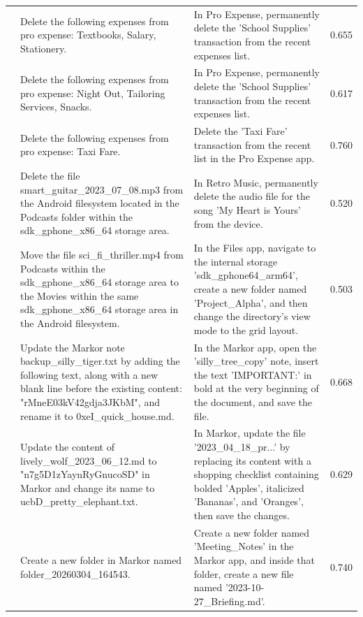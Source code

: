 \documentclass{article} %
\begin{document}
\begin{scriptsize}
\begin{longtable}{@{} c >{\raggedright\arraybackslash}p{} >{\raggedright\arraybackslash}p{} c @{}}
\addlinespace[2pt]
19 & Delete the following expenses from pro expense: Textbooks, Salary, Stationery. & In Pro Expense, permanently delete the 'School Supplies' transaction from the recent expenses list. & 0.655 \\
\addlinespace[2pt]
20 & Delete the following expenses from pro expense: Night Out, Tailoring Services, Snacks. & In Pro Expense, permanently delete the 'School Supplies' transaction from the recent expenses list. & 0.617 \\
\addlinespace[2pt]
21 & Delete the following expenses from pro expense: Taxi Fare. & Delete the 'Taxi Fare' transaction from the recent list in the Pro Expense app. & 0.760 \\
\addlinespace[2pt]
22 & Delete the file smart\_guitar\_2023\_07\_08.mp3 from the Android filesystem located in the Podcasts folder within the sdk\_gphone\_x86\_64 storage area. & In Retro Music, permanently delete the audio file for the song 'My Heart is Yours' from the device. & 0.520 \\
\addlinespace[2pt]
23 & Move the file sci\_fi\_thriller.mp4 from Podcasts within the sdk\_gphone\_x86\_64 storage area to the Movies within the same sdk\_gphone\_x86\_64 storage area in the Android filesystem. & In the Files app, navigate to the internal storage 'sdk\_gphone64\_arm64', create a new folder named 'Project\_Alpha', and then change the directory's view mode to the grid layout. & 0.503 \\
\addlinespace[2pt]
24 & Update the Markor note backup\_silly\_tiger.txt by adding the following text, along with a new blank line before the existing content: "rMneE03kV42gdja3JKbM", and rename it to 0xeI\_quick\_house.md. & In the Markor app, open the 'silly\_tree\_copy' note, insert the text 'IMPORTANT:' in bold at the very beginning of the document, and save the file. & 0.668 \\
\addlinespace[2pt]
25 & Update the content of lively\_wolf\_2023\_06\_12.md to "n7g5D1zYaynRyGnucoSD" in Markor and change its name to ucbD\_pretty\_elephant.txt. & In Markor, update the file '2023\_04\_18\_pr...' by replacing its content with a shopping checklist containing bolded 'Apples', italicized 'Bananas', and 'Oranges', then save the changes. & 0.629 \\
\addlinespace[2pt]
26 & Create a new folder in Markor named folder\_20260304\_164543. & Create a new folder named 'Meeting\_Notes' in the Markor app, and inside that folder, create a new file named '2023-10-27\_Briefing.md'. & 0.740 \\

\end{longtable}
\end{scriptsize}
\end{document}
